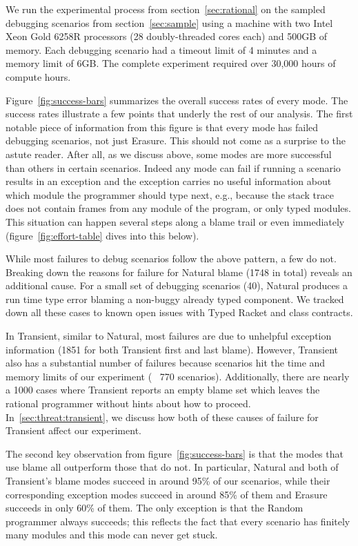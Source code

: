 We run the experimental process from section~\ref{sec:rational} on the
sampled debugging scenarios from section~\ref{sec:sample} using a machine with two Intel Xeon Gold 6258R processors (28 doubly-threaded cores each) and 500GB of memory.
Each debugging scenario had a timeout limit of 4 minutes and a
memory limit of 6GB. The complete experiment required
over 30,000 hours of compute hours.


Figure~\ref{fig:success-bars} summarizes the overall success rates of every mode.
The success rates illustrate a few points that underly the rest of our analysis.
The first notable piece of information from
this figure is that every mode has failed debugging scenarios, not just
Erasure. This should
not come as a surprise to the astute
reader. After all, as we
discuss above, some modes are more successful than others in certain
scenarios. Indeed any mode can fail if running a scenario results in an
exception and the exception carries no useful information about which
module the programmer should type next, e.g., because the stack trace 
does not contain frames from any module of the program, or only typed modules. This situation
can happen several steps along a blame trail or even immediately (figure~\ref{fig:effort-table} dives into this below).

While most failures to debug scenarios follow the above pattern, a few do not.
Breaking down the reasons for failure for Natural blame (1748 in total)
reveals an additional cause. For a small set of
debugging scenarios (40), Natural produces a run time type error
blaming a non-buggy already typed
component. We tracked down all these cases to known open issues with Typed
Racket and class contracts. 

In Transient, similar to Natural,
most failures are due to unhelpful exception information (1851 for both
Transient first and last blame).  
However, Transient also has a substantial
number of failures because scenarios hit the time and memory
limits of our experiment (~ 770 scenarios).  Additionally, there are nearly a 1000 cases where
Transient reports an empty blame set which leaves the rational programmer
without hints about how to proceed.
In~\ref{sec:threat:transient}, we discuss how both of these causes of
failure for Transient affect our experiment. 

The second key observation from figure~\ref{fig:success-bars} is that the modes that use blame all outperform those that do not.
In particular, Natural and both of Transient's blame modes succeed in around 95\% of our scenarios, while their corresponding exception modes succeed in around 85\% of them and Erasure succeeds in only 60\% of them.
The only exception is that the Random programmer always succeeds;
this reflects the fact that every scenario has finitely many modules and this mode can never get stuck.


